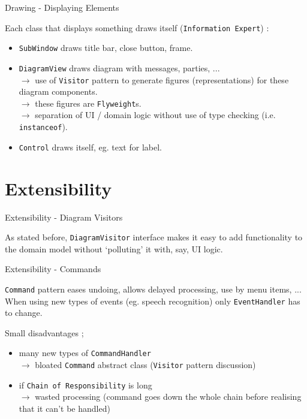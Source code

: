 \documentclass[10pt]{beamer}
\begin{document}
\begin{frame}[fragile]{Drawing - Displaying Elements}
	\begin{center}
	Each class that displays something draws itself (\texttt{Information Expert}) :
	\begin{itemize}
	\item \texttt{SubWindow} draws title bar, close button, frame.
	\item \texttt{DiagramView} draws diagram with messages, parties, ...
	\\$\rightarrow$ use of \texttt{Visitor} pattern to generate figures (representations) for these diagram components.
	\\$\rightarrow$ these figures are \texttt{Flyweight}s.
	\\$\rightarrow$ separation of UI / domain logic without use of type checking (i.e. \texttt{instanceof}).
	\item \texttt{Control} draws itself, eg. text for label.
	\end{itemize}
	\end{center}
\end{frame}

\section{Extensibility}

\begin{frame}[fragile]{Extensibility - Diagram Visitors}
	\begin{center}
		As stated before, \texttt{DiagramVisitor} interface makes it easy to add functionality to the domain model without `polluting' it with, say, UI logic.
	\end{center}
\end{frame}

\begin{frame}[fragile]{Extensibility - Commands}
	\begin{center}
	\texttt{Command} pattern eases undoing, allows delayed processing, use by menu items, ... When using new types of events (eg. speech recognition) only \texttt{EventHandler} has to change.
	
	\vspace{0.5cm} Small disadvantages ; 
	\begin{itemize}
	\item many new types of \texttt{CommandHandler} 
	\\ $\rightarrow$ bloated \texttt{Command} abstract class (\texttt{Visitor} pattern discussion)
	\item if \texttt{Chain of Responsibility} is long
	\\ $\rightarrow$ wasted processing (command goes down the whole chain before realising that it can't be handled)
	\end{itemize}
	\end{center}
\end{frame}
\end{document}
